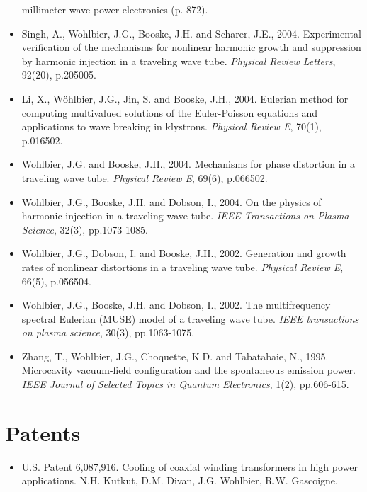 \documentclass{muratcan_cv}
\begin{document}
\begin{itemize}
  millimeter-wave power electronics (p. 872).
\item Singh, A., Wohlbier, J.G., Booske, J.H. and Scharer, J.E.,
  2004. Experimental verification of the mechanisms for nonlinear
  harmonic growth and suppression by harmonic injection in a traveling
  wave tube. {\it Physical Review Letters}, 92(20), p.205005.
\item Li, X., Wöhlbier, J.G., Jin, S. and Booske, J.H., 2004. Eulerian
  method for computing multivalued solutions of the Euler-Poisson
  equations and applications to wave breaking in klystrons. {\it Physical
    Review E}, 70(1), p.016502.
\item Wohlbier, J.G. and Booske, J.H., 2004. Mechanisms for phase
  distortion in a traveling wave tube. {\it Physical Review E}, 69(6),
  p.066502.
\item Wohlbier, J.G., Booske, J.H. and Dobson, I., 2004. On the
  physics of harmonic injection in a traveling wave tube. {\it IEEE
    Transactions on Plasma Science}, 32(3), pp.1073-1085.
\item Wohlbier, J.G., Dobson, I. and Booske, J.H., 2002. Generation
  and growth rates of nonlinear distortions in a traveling wave
  tube. {\it Physical Review E}, 66(5), p.056504.
\item Wohlbier, J.G., Booske, J.H. and Dobson, I., 2002. The
  multifrequency spectral Eulerian (MUSE) model of a traveling wave
  tube. {\it IEEE transactions on plasma science}, 30(3), pp.1063-1075.
\item Zhang, T., Wohlbier, J.G., Choquette, K.D. and Tabatabaie, N.,
  1995. Microcavity vacuum-field configuration and the spontaneous
  emission power. {\it IEEE Journal of Selected Topics in Quantum
    Electronics}, 1(2), pp.606-615.
\end{itemize}

\section{Patents}
\begin{itemize}
  \footnotesize
\item U.S. Patent 6,087,916. Cooling of coaxial winding transformers in
  high power applications. N.H. Kutkut, D.M. Divan, J.G. Wohlbier,
  R.W. Gascoigne.
\end{itemize}
\end{document}
